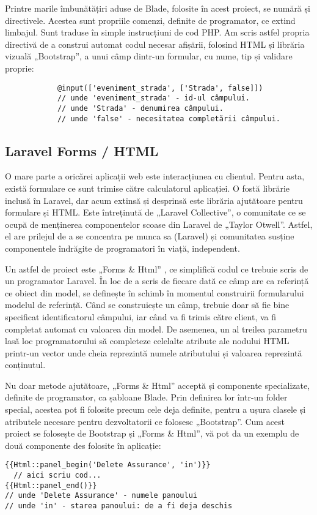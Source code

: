 		Printre marile îmbunătățiri aduse de Blade, folosite în acest proiect, se numără și directivele.
		Acestea sunt propriile comenzi, definite de programator, ce extind limbajul.
		Sunt traduse în simple instrucțiuni de cod PHP.
		Am scris astfel propria directivă de a construi automat codul necesar afișării, folosind HTML și librăria vizuală „Bootstrap”, a unui câmp dintr-un formular, cu nume, tip și validare proprie:
		\begin{verbatim}
			@input(['eveniment_strada', ['Strada', false]])
			// unde 'eveniment_strada' - id-ul câmpului.
			// unde 'Strada' - denumirea câmpului.
			// unde 'false' - necesitatea completării câmpului.
		\end{verbatim}

	\subsection{Laravel Forms / HTML}


		O mare parte a oricărei aplicații web este interacțiunea cu clientul.
		Pentru asta, există formulare ce sunt trimise către calculatorul aplicației.
		O fostă librărie inclusă în Laravel, dar acum extinsă și desprinsă este librăria ajutătoare pentru formulare și HTML.
		Este întreținută de „Laravel Collective”, o comunitate ce se ocupă de menținerea componentelor scoase din Laravel de „Taylor Otwell”.
		Astfel, el are prilejul de a se concentra pe munca sa (Laravel) și comunitatea susține componentele îndrăgite de programatori în viață, independent.\cite{laravel_collective_about}

		Un astfel de proiect este „Forms \& Html” \cite{laravel_collective_forms}, ce simplifică codul ce trebuie scris de un programator Laravel.
		În loc de a scris de fiecare dată ce câmp are ca referință ce obiect din model, se definește în schimb în momentul construirii formularului modelul de referință.
		Când se construiește un câmp, trebuie doar să fie bine specificat identificatorul câmpului, iar când va fi trimis către client, va fi completat automat cu valoarea din model.
		De asemenea, un al treilea parametru lasă loc programatorului să completeze celelalte atribute ale nodului HTML printr-un vector unde cheia reprezintă numele atributului și valoarea reprezintă conținutul.

		Nu doar metode ajutătoare, „Forms \& Html” acceptă și componente specializate, definite de programator, ca șabloane Blade.
		Prin definirea lor într-un folder special, acestea pot fi folosite precum cele deja definite, pentru a ușura clasele și atributele necesare pentru dezvoltatorii ce folosesc „Bootstrap”.
		Cum acest proiect se folosește de Bootstrap și „Forms \& Html”, vă pot da un exemplu de două componente des folosite în aplicație:
		\begin{Verbatim}
{{Html::panel_begin('Delete Assurance', 'in')}}
  // aici scriu cod...
{{Html::panel_end()}}
// unde 'Delete Assurance' - numele panoului
// unde 'in' - starea panoului: de a fi deja deschis
		\end{Verbatim}


